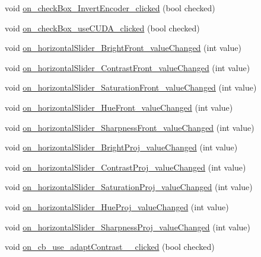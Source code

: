\begin{DoxyCompactItemize}
\item 
void \hyperlink{class_dialog_settings_a77049e8a045e88d549648bf8a52d18b1}{on\+\_\+check\+Box\+\_\+\+Invert\+Encoder\+\_\+clicked} (bool checked)
\item 
void \hyperlink{class_dialog_settings_a621bee1594767554a084f331beff483a}{on\+\_\+check\+Box\+\_\+use\+C\+U\+D\+A\+\_\+clicked} (bool checked)
\item 
void \hyperlink{class_dialog_settings_af24b06407f4dc58ebe93979c91bedcbb}{on\+\_\+horizontal\+Slider\+\_\+\+Bright\+Front\+\_\+value\+Changed} (int value)
\item 
void \hyperlink{class_dialog_settings_a5932a6370c7314c3beeb37fb47292875}{on\+\_\+horizontal\+Slider\+\_\+\+Contrast\+Front\+\_\+value\+Changed} (int value)
\item 
void \hyperlink{class_dialog_settings_a7d58b34cefab1de3cda64b0cc83f40a4}{on\+\_\+horizontal\+Slider\+\_\+\+Saturation\+Front\+\_\+value\+Changed} (int value)
\item 
void \hyperlink{class_dialog_settings_ad058e3bb68bde789b767cd1a9d7a59d3}{on\+\_\+horizontal\+Slider\+\_\+\+Hue\+Front\+\_\+value\+Changed} (int value)
\item 
void \hyperlink{class_dialog_settings_adf1f4d3c4ff223c4c183ae271819fc8c}{on\+\_\+horizontal\+Slider\+\_\+\+Sharpness\+Front\+\_\+value\+Changed} (int value)
\item 
void \hyperlink{class_dialog_settings_ade5e4c2418d4356e0776fbb000757c80}{on\+\_\+horizontal\+Slider\+\_\+\+Bright\+Proj\+\_\+value\+Changed} (int value)
\item 
void \hyperlink{class_dialog_settings_a2f1a2b46e08ed3e6a99b6e3108879002}{on\+\_\+horizontal\+Slider\+\_\+\+Contrast\+Proj\+\_\+value\+Changed} (int value)
\item 
void \hyperlink{class_dialog_settings_ac3d7c7b3ea9f5a0e3c39b924556f5ea2}{on\+\_\+horizontal\+Slider\+\_\+\+Saturation\+Proj\+\_\+value\+Changed} (int value)
\item 
void \hyperlink{class_dialog_settings_a14f0a0e04c6eac16c0964b0799bad307}{on\+\_\+horizontal\+Slider\+\_\+\+Hue\+Proj\+\_\+value\+Changed} (int value)
\item 
void \hyperlink{class_dialog_settings_ac1eb97de9fde47bdb9841b52724663a7}{on\+\_\+horizontal\+Slider\+\_\+\+Sharpness\+Proj\+\_\+value\+Changed} (int value)
\item 
void \hyperlink{class_dialog_settings_a245bc00aa16dfc97577fe2db8c1e1036}{on\+\_\+cb\+\_\+use\+\_\+adapt\+Contrast\+\_\+\_\+clicked} (bool checked)
\item 

\end{DoxyCompactItemize}

